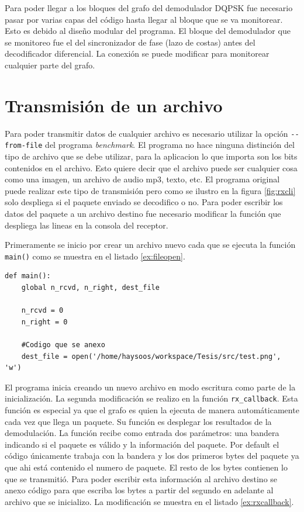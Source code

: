 Para poder llegar a los bloques del grafo del demodulador DQPSK fue necesario pasar por varias capas
del c\'odigo hasta llegar al bloque que se va monitorear. Esto es debido al dise\~no modular del
programa. El bloque del demodulador que se monitoreo fue el del sincronizador de fase (lazo de
costas) antes del decodificador diferencial. La conexi\'on se puede modificar para monitorear
cualquier parte del grafo.

\section{Transmisi\'on de un archivo}
Para poder transmitir datos de cualquier archivo es necesario utilizar la opci\'on
\verb|--from-file| del programa \emph{benchmark}. El programa no hace ninguna distinci\'on del tipo
de archivo que se debe utilizar, para la aplicacion lo que importa son los bits contenidos en el
archivo. Esto quiere decir que el archivo puede ser cualquier cosa como una imagen, un archivo de
audio mp3, texto, etc. El programa original puede realizar este tipo de transmisi\'on pero como se
ilustro en la figura \ref{fig:rxcli} solo despliega si el paquete enviado se decodifico o no. Para
poder escribir los datos del paquete a un archivo destino fue necesario modificar la funci\'on que
despliega las lineas en la consola del receptor.

Primeramente se inicio por crear un archivo nuevo cada que se ejecuta la funci\'on \verb|main()|
como se muestra en el listado \ref{ex:fileopen}.

\begin{lstlisting}[float, label=ex:fileopen, caption={C\'odigo anexo a la funci\'on main del
programa benchmark para abrir un nuevo archivo destino.}, breaklines=true]
def main():
    global n_rcvd, n_right, dest_file

    n_rcvd = 0
    n_right = 0

	#Codigo que se anexo
    dest_file = open('/home/haysoos/workspace/Tesis/src/test.png', 'w')
\end{lstlisting}

El programa inicia creando un nuevo archivo en modo escritura como parte de la inicializaci\'on. La
segunda modificaci\'on se realizo en la funci\'on \verb|rx_callback|. Esta funci\'on es
especial ya que el grafo es quien la ejecuta de manera autom\'aticamente cada vez que llega un
paquete. Su funci\'on es desplegar los resultados de la demodulaci\'on. La funci\'on recibe como
entrada dos par\'ametros: una bandera indicando si el paquete es v\'alido y la informaci\'on del
paquete. Por default el c\'odigo \'unicamente trabaja con la bandera y los dos primeros bytes del
paquete ya que ahi est\'a contenido el numero de paquete. El resto de los bytes contienen lo que se
transmiti\'o. Para poder escribir esta informaci\'on al archivo destino se anexo c\'odigo para que
escriba los bytes a partir del segundo en adelante al archivo que se inicializo. La modificaci\'on
se muestra en el listado \ref{ex:rxcallback}.

